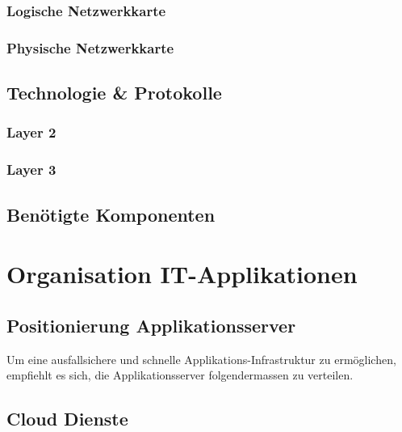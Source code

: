 \subsubsection{Logische Netzwerkkarte}
\subsubsection{Physische Netzwerkkarte}

\subsection{Technologie \& Protokolle}
\subsubsection{Layer 2}
\subsubsection{Layer 3}

\subsection{Benötigte Komponenten}

\section{Organisation IT-Applikationen}

\subsection{Positionierung Applikationsserver}

Um eine ausfallsichere und schnelle Applikations-Infrastruktur zu ermöglichen, empfiehlt es sich, die Applikationsserver folgendermassen zu verteilen.

\subsection{Cloud Dienste}



